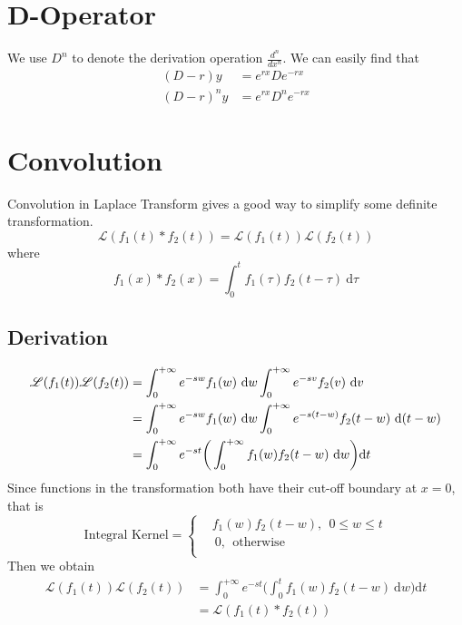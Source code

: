 \documentclass[25pt]{article}
\begin{document}
\section{D-Operator}
We use $D^n$ to denote the derivation operation $\frac{d^n}{dx^n}$. We can easily find that 
\begin{equation}
\begin{aligned}
    (D - r)y &= e^{rx}De^{-rx} \\ 
    (D-r)^n y &= e^{rx}D^n e^{-rx}
\end{aligned}
\end{equation}
\section{Convolution}
Convolution in Laplace Transform gives a good way to simplify some definite transformation.
\begin{equation}
    \boxed{\mathscr{L}(f_1(t) * f_2(t)) = \mathscr{L}(f_1(t)) \mathscr{L}(f_2(t))}
\end{equation}
where 
\begin{equation}
    f_1(x)*f_2(x) = \int^{t}_{0} f_1(\tau)f_2(t-\tau)~\text{d} \tau
\end{equation}
\subsection{Derivation}
\begin{equation}
\begin{aligned}
    \mathscr{L}(f_1(t))\mathscr{L}(f_2(t)) &= 
    \int^{+\infty}_{0} e^{-sw} f_1(w)~\text{d}w \int^{+\infty}_{0} e^{-sv} f_2(v)~\text{d}v \\ &= \int^{+\infty}_{0} e^{-sw}f_1(w)~\text{d}w \int^{+\infty}_{0}e^{-s(t-w)}f_2(t-w)~\text{d}(t-w)\\
    &= \int^{+\infty}_{0} e^{-st} \bigg(\int^{+\infty}_{0} f_1(w)f_2(t-w) ~\text{d}w \bigg) \text{d}t \notag
\end{aligned}
\end{equation}
Since functions in the transformation both have their cut-off boundary at $x=0$, that is 
\begin{equation}
\text{Integral Kernel} = \left\{
\begin{aligned}
    & f_1(w)f_2(t-w),~~0\leq w \leq t \\
    &~0,~~\text{otherwise} \\
\end{aligned}
\right.
\end{equation}
Then we obtain
\begin{equation}
\begin{aligned}
    \mathscr{L}(f_1(t))\mathscr{L}(f_2(t)) &= \int^{+\infty}_{0}e^{-st}\bigg(\int^{t}_{0}f_1(w)f_2(t-w)~\text{d}w\bigg)\text{d}t \\
    &= \mathscr{L}(f_1(t)*f_2(t)) 
\end{aligned}
\end{equation}
\end{document}
